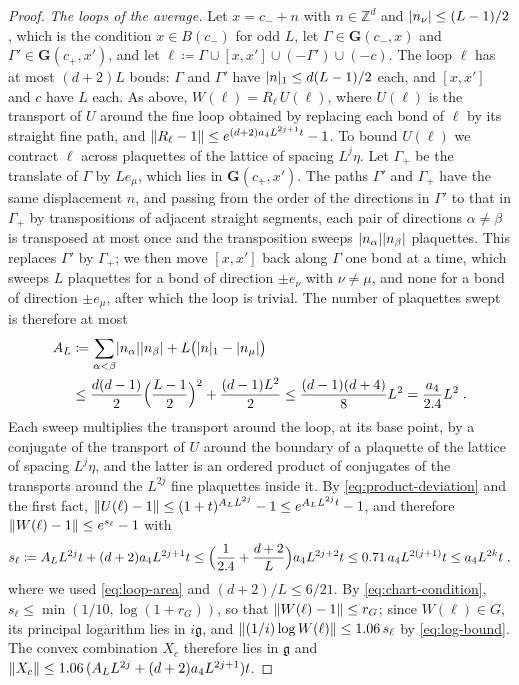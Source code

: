 \documentclass[11pt]{preprint}
\DeclarePairedDelimiter{\abs}{\lvert}{\rvert}
\DeclarePairedDelimiter{\norm}{\lVert}{\rVert}
\numberwithin{equation}{section}
\theoremstyle{definition}
\theoremstyle{remark}
\theoremstyle{plain}
\begin{document}
\begin{proof}
\emph{The loops of the average.} Let $x = c_- + n$ with $n \in \mathbb Z^d$ and $\abs{n_\nu} \leq (L - 1)/2$, which is the condition $x \in B(c_-)$ for odd $L$, let $\Gamma \in \mathbf G(c_-, x)$ and $\Gamma' \in \mathbf G(c_+, x')$, and let $\ell \coloneqq \Gamma \cup [x, x'] \cup (-\Gamma') \cup (-c)$. The loop $\ell$ has at most $(d + 2)L$ bonds: $\Gamma$ and $\Gamma'$ have $\abs{n}_1 \leq d(L - 1)/2$ each, and $[x, x']$ and $c$ have $L$ each. As above, $W(\ell) = R_\ell\,U(\ell)$, where $U(\ell)$ is the transport of $U$ around the fine loop obtained by replacing each bond of $\ell$ by its straight fine path, and $\norm{R_\ell - 1} \leq e^{(d+2)a_4L^{2j+1}t} - 1$. To bound $U(\ell)$ we contract $\ell$ across plaquettes of the lattice of spacing $L^j\eta$. Let $\Gamma_+$ be the translate of $\Gamma$ by $Le_\mu$, which lies in $\mathbf G(c_+, x')$. The paths $\Gamma'$ and $\Gamma_+$ have the same displacement $n$, and passing from the order of the directions in $\Gamma'$ to that in $\Gamma_+$ by transpositions of adjacent straight segments, each pair of directions $\alpha \neq \beta$ is transposed at most once and the transposition sweeps $\abs{n_\alpha}\abs{n_\beta}$ plaquettes. This replaces $\Gamma'$ by $\Gamma_+$; we then move $[x, x']$ back along $\Gamma$ one bond at a time, which sweeps $L$ plaquettes for a bond of direction $\pm e_\nu$ with $\nu \neq \mu$, and none for a bond of direction $\pm e_\mu$, after which the loop is trivial. The number of plaquettes swept is therefore at most
\begin{equation}\label{eq:loop-area}
\begin{split}
    A_L &\coloneqq \sum_{\alpha < \beta}\abs{n_\alpha}\abs{n_\beta} + L\bigl(\abs{n}_1 - \abs{n_\mu}\bigr)\\
    &\leq \frac{d(d - 1)}{2}\Bigl(\frac{L - 1}{2}\Bigr)^2 + \frac{(d - 1)L^2}{2} \leq \frac{(d - 1)(d + 4)}{8}L^2 = \frac{a_4}{2.4}L^2\;.
\end{split}
\end{equation}
Each sweep multiplies the transport around the loop, at its base point, by a conjugate of the transport of $U$ around the boundary of a plaquette of the lattice of spacing $L^j\eta$, and the latter is an ordered product of conjugates of the transports around the $L^{2j}$ fine plaquettes inside it. By \eqref{eq:product-deviation} and the first fact, $\norm{U(\ell) - 1} \leq (1 + t)^{A_LL^{2j}} - 1 \leq e^{A_LL^{2j}t} - 1$, and therefore $\norm{W(\ell) - 1} \leq e^{s_\ell} - 1$ with
\begin{equation}\label{eq:loop-deviation}
    s_\ell \coloneqq A_LL^{2j}t + (d + 2)a_4L^{2j+1}t \leq \Bigl(\frac{1}{2.4} + \frac{d + 2}{L}\Bigr)a_4L^{2j+2}t \leq 0.71\,a_4L^{2(j+1)}t \leq a_4L^{2k}t\;,
\end{equation}
where we used \eqref{eq:loop-area} and $(d + 2)/L \leq 6/21$. By \eqref{eq:chart-condition}, $s_\ell \leq \min(1/10, \log(1 + r_G))$, so that $\norm{W(\ell) - 1} \leq r_G$; since $W(\ell) \in G$, its principal logarithm lies in $i\mathfrak g$, and $\norm{(1/i)\log W(\ell)} \leq 1.06\,s_\ell$ by \eqref{eq:log-bound}. The convex combination $X_c$ therefore lies in $\mathfrak g$ and $\norm{X_c} \leq 1.06\,(A_LL^{2j} + (d + 2)a_4L^{2j+1})t$.


\end{proof}
\end{document}

